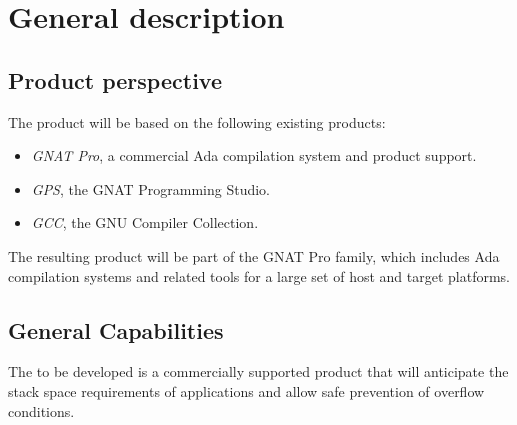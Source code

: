 \chapter{General description}\label{ch:description}

\section{Product perspective}

The \ssat{} product will be based on the following existing products:

\begin{itemize}
\item \emph{GNAT Pro}, a commercial Ada compilation system and product
  support.
\item \emph{GPS}, the GNAT Programming Studio.
\item \emph{GCC}, the GNU Compiler Collection.
\end{itemize}

The resulting product will be part of the GNAT Pro family, which
includes Ada compilation systems and related tools for a large set of
host and target platforms.

\section{General Capabilities}

The \ssat{} to be developed is a commercially supported product that
will anticipate the stack space requirements of applications and allow
safe prevention of overflow conditions.

